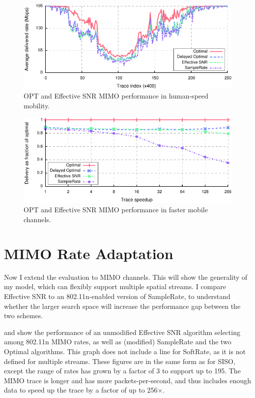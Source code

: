 \begin{figure}[t]
      \centering
      \includegraphics[width=\textwidth]{figures/rate/mimo_rate_time.pdf}
      \caption[OPT and Effective SNR MIMO performance in human-speed mobility]{\label{fig:mimo_eff_snr_time} OPT and Effective SNR MIMO performance in human-speed mobility.}
\end{figure}

\begin{figure}[ht]
      \centering
      \includegraphics[width=\textwidth]{figures/rate/mimo_rate_skip_ratio.pdf}
      \caption[OPT and Effective SNR MIMO performance in fast mobile channels]{\label{fig:mimo_eff_snr_speedup} OPT and Effective SNR MIMO performance in faster mobile channels.}
\end{figure}

\section{MIMO Rate Adaptation}
Now I extend the evaluation to MIMO channels. This will show the generality of my model, which can flexibly support multiple spatial streams. I compare Effective SNR to an 802.11n-enabled version of SampleRate, to understand whether the larger search space will increase the performance gap between the two schemes.

 and  show the performance of an unmodified Effective SNR algorithm selecting among 802.11n MIMO rates, as well as (modified) SampleRate and the two Optimal algorithms. This graph does not include a line for SoftRate, as it is not defined for multiple streams.
These figures are in the same form as for SISO, except the range of rates has grown by a factor of 3 to support up to 195\Mbps. The MIMO trace is longer and has more packets-per-second, and thus includes enough data to speed up the trace by a factor of up to 256$\times$.

